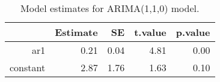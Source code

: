 \begin{table}[ht]
\centering
\begin{tabular}{rrrrr}
  \hline
 & Estimate & SE & t.value & p.value \\ 
  \hline
ar1 & 0.21 & 0.04 & 4.81 & 0.00 \\ 
  constant & 2.87 & 1.76 & 1.63 & 0.10 \\ 
   \hline
\end{tabular}
\caption{Model estimates for ARIMA(1,1,0) model.}
\end{table}